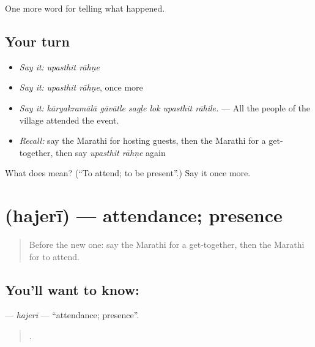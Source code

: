 \begin{grammarlens}[title={What you've built}]
One more word for telling what happened.
\end{grammarlens}

\subsection*{Your turn}
\begin{itemize}
\raggedright
  \item \emph{Say it:} \emph{upasthit rāhṇe}
  \item \emph{Say it:} \emph{upasthit rāhṇe}, once more
  \item \emph{Say it:} \emph{kāryakramālā gāvātle sagḷe lok upasthit rāhile.} — All the people of the village attended the event.
  \item \emph{Recall:} say the Marathi for hosting guests, then the Marathi for a get-together, then say \emph{upasthit rāhṇe} again
\end{itemize}

\begin{tcolorbox}[breakable,colback=teal!4,colframe=teal!35!black,title={Before you move on}]
What does   mean? (\textquotedblleft{}To attend; to be present\textquotedblright{}.) Say it once more.
\end{tcolorbox}
\section[\texorpdfstring{\mr{हजेरी} (hajerī)}{हजेरी (hajerī)}]{ (hajerī) — attendance; presence}

\label{lesson:MR-C321-hajeri}



\begin{quote}
Before the new one: say the Marathi for a get-together, then the Marathi for to attend.
\end{quote}

\subsection*{You'll want to know: }
\textbf{} — \emph{hajerī} — \textquotedblleft{}attendance; presence\textquotedblright{}.

\begin{quote}
   .
\end{quote}

